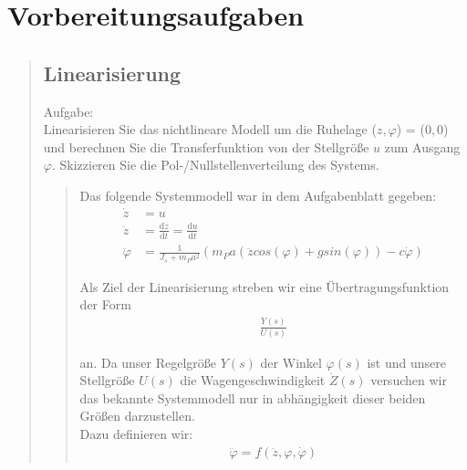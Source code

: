 \section{Vorbereitungsaufgaben}
\begin{quote}
	\hspace{-2em}
	\subsection{Linearisierung}
    Aufgabe:\\
    Linearisieren Sie das nichtlineare Modell um die Ruhelage ($z, \varphi$) = ($0, 0$) und berechnen Sie die
    Transferfunktion von der Stellgröße $u$ zum Ausgang $\varphi$. Skizzieren Sie die Pol-/Nullstellenverteilung des
    Systems.
	\begin{quote}
	   Das folgende Systemmodell war in dem Aufgabenblatt gegeben:
	   \begin{equation*}
        	\begin{split}
        		\dot{z} &= u\\
        		\ddot{z} &=\frac{\mathrm d\dot{z}}{\mathrm d t} = \frac{\mathrm du}{\mathrm d t}\\
        		\ddot{\varphi} &= \frac{1}{J_s + m_P a^2} ( m_P a (\ddot{z}cos(\varphi) +g sin(\varphi))-c\dot{\varphi})
        	\end{split}
        \end{equation*}
        
        Als Ziel der Linearisierung streben wir eine Übertragungsfunktion der Form 
        \begin{equation*}
        	\begin{split}
        		\frac{Y(s)}{U(s)}
        	\end{split}
        \end{equation*}
        
        an. Da unser Regelgröße $Y(s)$ der Winkel $\varphi(s)$ ist und unsere Stellgröße $U(s)$ die Wagengeschwindigkeit
        $\dot{Z}(s)$ versuchen wir das bekannte Systemmodell nur in abhängigkeit dieser beiden Größen darzustellen.\\
        Dazu definieren wir:
        \begin{equation*}
        	\begin{split}
        		\ddot{\varphi} = f(\ddot{z}, \varphi, \dot{\varphi})
        	\end{split}
        \end{equation*}
        

\end{quote}
\end{quote}
